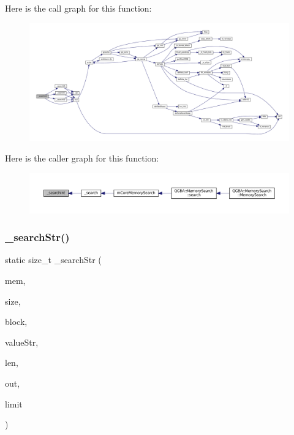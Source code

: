 Here is the call graph for this function\+:
\nopagebreak
\begin{figure}[H]
\begin{center}
\leavevmode
\includegraphics[width=350pt]{mem-search_8c_a1af85652c37edd16f2558ee8b15a4a9f_cgraph}
\end{center}
\end{figure}
Here is the caller graph for this function\+:
\nopagebreak
\begin{figure}[H]
\begin{center}
\leavevmode
\includegraphics[width=350pt]{mem-search_8c_a1af85652c37edd16f2558ee8b15a4a9f_icgraph}
\end{center}
\end{figure}
\mbox{\label{mem-search_8c_a3ed6b56c8b6b869abae56fc00b22fa4d}} 
\subsubsection{\texorpdfstring{\+\_\+search\+Str()}{\_searchStr()}}
{\footnotesize\ttfamily static size\+\_\+t \+\_\+search\+Str (\begin{DoxyParamCaption}\item[{const void $\ast$}]{mem,  }\item[{size\+\_\+t}]{size,  }\item[{const struct m\+Core\+Memory\+Block $\ast$}]{block,  }\item[{const char $\ast$}]{value\+Str,  }\item[{\mbox{\hyperlink{ioapi_8h_a787fa3cf048117ba7123753c1e74fcd6}{int}}}]{len,  }\item[{struct m\+Core\+Memory\+Search\+Results $\ast$}]{out,  }\item[{size\+\_\+t}]{limit }\end{DoxyParamCaption})\hspace{0.3cm}{\ttfamily [static]}}

